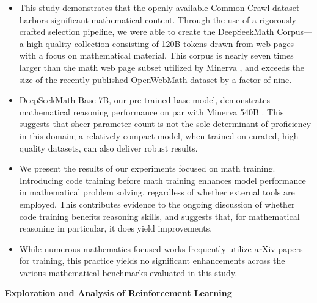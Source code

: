 \begin{itemize}[topsep=0pt]
    \item This study demonstrates that the openly available Common Crawl dataset harbors significant mathematical content. Through the use of a rigorously crafted selection pipeline, we were able to create the DeepSeekMath Corpus—a high-quality collection consisting of 120B tokens drawn from web pages with a focus on mathematical material. This corpus is nearly seven times larger than the math web page subset utilized by Minerva \citep{minerva}, and exceeds the size of the recently published OpenWebMath dataset \citep{openwebmath} by a factor of nine.

\item DeepSeekMath-Base 7B, our pre-trained base model, demonstrates mathematical reasoning performance on par with Minerva 540B \citep{minerva}. This suggests that sheer parameter count is not the sole determinant of proficiency in this domain; a relatively compact model, when trained on curated, high-quality datasets, can also deliver robust results.

\item We present the results of our experiments focused on math training. Introducing code training before math training enhances model performance in mathematical problem solving, regardless of whether external tools are employed. This contributes evidence to the ongoing discussion of whether code training benefits reasoning skills, and suggests that, for mathematical reasoning in particular, it does yield improvements.

\item While numerous mathematics-focused works frequently utilize arXiv papers for training, this practice yields no significant enhancements across the various mathematical benchmarks evaluated in this study.
\end{itemize}

\textbf{Exploration and Analysis of Reinforcement Learning}

